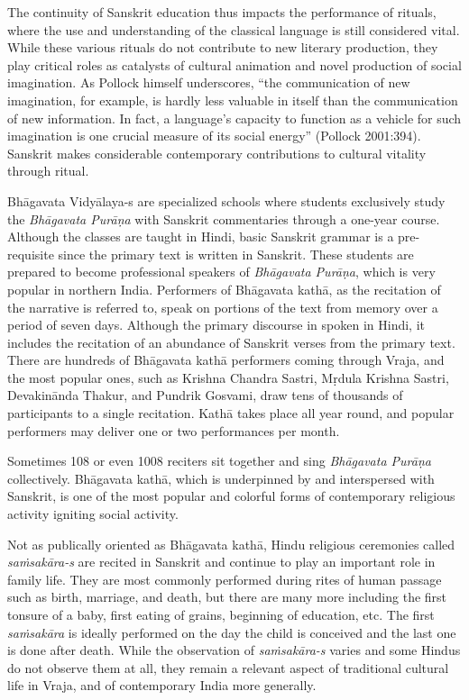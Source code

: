 The continuity of Sanskrit education thus impacts the performance of rituals, where the use and understanding of the classical language is still considered vital. While these various rituals do not contribute to new literary production, they play critical roles as catalysts of cultural animation and novel production of social imagination. As Pollock himself underscores, “the communication of new imagination, for example, is hardly less valuable in itself than the communication of new information. In fact, a language’s capacity to function as a vehicle for such imagination is one crucial measure of its social energy” (Pollock 2001:394). Sanskrit makes considerable contemporary contributions to cultural vitality through ritual. 

Bhāgavata Vidyālaya-s are specialized schools where students exclusively study the {\sl Bhāgavata Purāṇa} with Sanskrit commentaries through a one-year course. Although the classes are taught in Hindi, basic Sanskrit grammar is a pre-requisite since the primary text is written in Sanskrit. These students are prepared to become professional speakers of {\sl Bhāgavata Purāṇa}, which is very popular in northern India. Performers of Bhāgavata kathā, as the recitation of the narrative is referred to, speak on portions of the text from memory over a period of seven days. Although the primary discourse in spoken in Hindi, it includes the recitation of an abundance of Sanskrit verses from the primary text. There are hundreds of Bhāgavata kathā performers coming through Vraja, and the most popular ones, such as Krishna Chandra Sastri, Mṛdula Krishna Sastri, Devakinānda Thakur, and Pundrik Gosvami, draw tens of thousands of participants to a single recitation. Kathā takes place all year round, and popular performers may deliver one or two performances per month. 

Sometimes 108 or even 1008 reciters sit together and sing {\sl Bhāgavata Purāṇa} collectively. Bhāgavata kathā, which is underpinned by and interspersed with Sanskrit, is one of the most popular and colorful forms of contemporary religious activity igniting social activity. 

Not as publically oriented as Bhāgavata kathā, Hindu religious ceremonies called {\sl saṁsakāra-s} are recited in Sanskrit and continue to play an important role in family life. They are most commonly performed during rites of human passage such as birth, marriage, and death, but there are many more including the first tonsure of a baby, first eating of grains, beginning of education, etc. The first {\sl saṁsakāra} is ideally performed on the day the child is conceived and the last one is done after death. While the observation of {\sl saṁsakāra-s} varies and some Hindus do not observe them at all, they remain a relevant aspect of traditional cultural life in Vraja, and of contemporary India more generally.

